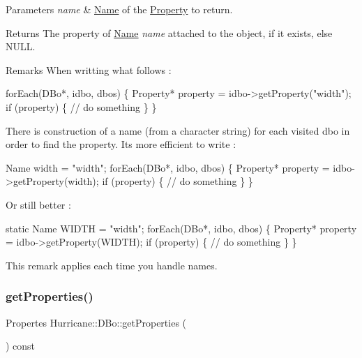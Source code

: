 \begin{DoxyParams}{Parameters}
{\em name} & \mbox{\hyperlink{classHurricane_1_1Name}{Name}} of the \mbox{\hyperlink{classHurricane_1_1Property}{Property}} to return. \\
\hline
\end{DoxyParams}
\begin{DoxyReturn}{Returns}
The property of \mbox{\hyperlink{classHurricane_1_1Name}{Name}} {\itshape name} attached to the object, if it exists, else {\ttfamily N\+U\+LL}.
\end{DoxyReturn}
\begin{DoxyRemark}{Remarks}
When writting what follows \+: 
\begin{DoxyCode}
forEach(DBo*, idbo, dbos) \{
  Property* \textcolor{keyword}{property} = idbo->getProperty(\textcolor{stringliteral}{"width"});
  \textcolor{keywordflow}{if} (property) \{
    \textcolor{comment}{// do something}
  \}
\}
\end{DoxyCode}

\end{DoxyRemark}
There is construction of a name (from a character string) for each visited dbo in order to find the property. It\textquotesingle{}s more efficient to write \+: 
\begin{DoxyCode}
Name width = \textcolor{stringliteral}{"width"};
forEach(DBo*, idbo, dbos) \{
  Property* \textcolor{keyword}{property} = idbo->getProperty(width);
  \textcolor{keywordflow}{if} (property) \{
    \textcolor{comment}{// do something}
  \}
\}
\end{DoxyCode}
 Or still better \+: 
\begin{DoxyCode}
\textcolor{keyword}{static} Name WIDTH = \textcolor{stringliteral}{"width"};
forEach(DBo*, idbo, dbos) \{
  Property* \textcolor{keyword}{property} = idbo->getProperty(WIDTH);
  \textcolor{keywordflow}{if} (property) \{
    \textcolor{comment}{// do something}
  \}
\}
\end{DoxyCode}
 This remark applies each time you handle names. \mbox{\label{classHurricane_1_1DBo_aec46894a10e83abb54c495dc4d90f2d3}} 
\subsubsection{\texorpdfstring{get\+Properties()}{getProperties()}}
{\footnotesize\ttfamily Propertes Hurricane\+::\+D\+Bo\+::get\+Properties (\begin{DoxyParamCaption}{ }\end{DoxyParamCaption}) const}

